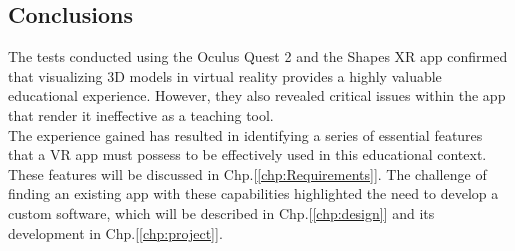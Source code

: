 \subsection{Conclusions}
\noindent
The tests conducted using the Oculus Quest 2 and the Shapes XR app confirmed that visualizing 3D models in virtual reality provides a highly valuable educational experience.
However, they also revealed critical issues within the app that render it ineffective as a teaching tool.\\
The experience gained has resulted in identifying a series of essential features that a VR app must possess to be effectively used in this educational context.
These features will be discussed in Chp.[\ref{chp:Requirements}]. The challenge of finding an existing app with these capabilities highlighted the need to develop a custom software, which will be described in Chp.[\ref{chp:design}] and its development in Chp.[\ref{chp:project}].
